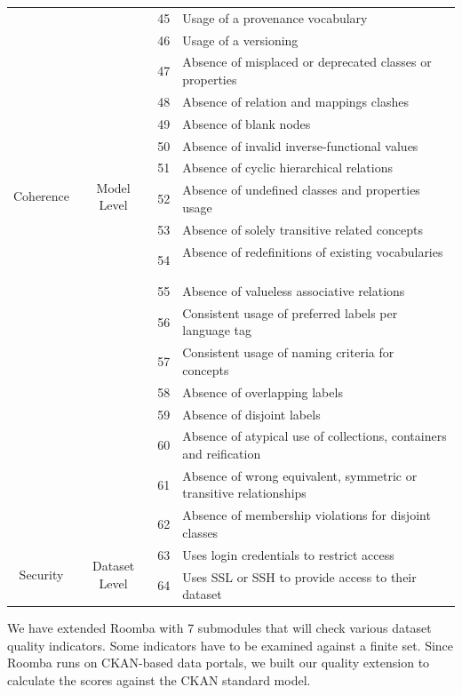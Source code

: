 \documentclass[a4paper,11pt,twoside]{ThesisStyle}
\begin{document}
\begin{center}
{\begin{longtable}[h]{|c|c|c|l|}
\cline{3-4}
 &  & 45 & Usage of a provenance vocabulary\tabularnewline
 \cline{3-4}
 &  & 46 & Usage of a versioning\tabularnewline
\hline
\hline
\multirow{10}{*}{Coherence} & \multirow{10}{*}{Model Level} & 47 & Absence of misplaced or deprecated classes or properties ~\cite{Hogan:LDOW:10}\tabularnewline
\cline{3-4}
 &  & 48 & Absence of relation and mappings clashes ~\cite{Suominen:IKEM:12}\tabularnewline
\cline{3-4}
 &  & 49 & Absence of blank nodes~\cite{Hogan:WebSemJorunal:12}\tabularnewline
\cline{3-4}
 &  & 50 & Absence of invalid inverse-functional values~\cite{Hogan:LDOW:10}\tabularnewline
\cline{3-4}
 &  & 51 & Absence of cyclic hierarchical relations~\cite{Dagobert:DL:02,Suominen:IKEM:12,Mader:TBDL:12}\tabularnewline
\cline{3-4}
 &  & 52 & Absence of undefined classes and properties usage~\cite{Hogan:LDOW:10}\tabularnewline
\cline{3-4}
 &  & 53 & Absence of solely transitive related concepts~\cite{Mader:TBDL:12}\tabularnewline
\cline{3-4}
 &  & 54 & Absence of redefinitions of existing vocabularies ~\cite{Hogan:LDOW:10}\tabularnewline
\cline{3-4}
 &  & 55 & Absence of valueless associative relations ~\cite{Mader:TBDL:12}\tabularnewline
\hline
\hline
\multirow{7}{*}{Consistency}
 & \multirow{7}{*}{Model Level}
& 56 & Consistent usage of preferred labels per language tag~\cite{Isaac:W3C:09,Mader:TBDL:12}\tabularnewline
 \cline{3-4}
 & & 57 & Consistent usage of naming criteria for concepts~\cite{Maria:KEOD:13}\tabularnewline
\cline{3-4}
 &  & 58 & Absence of overlapping labels\tabularnewline
\cline{3-4}
 &  & 59 & Absence of disjoint labels~\cite{Mader:TBDL:12}\tabularnewline
\cline{3-4}
 & & 60 & Absence of atypical use of collections, containers and reification~\cite{Hogan:LDOW:10}\tabularnewline
\cline{3-4}
 &  & 61 & Absence of wrong equivalent, symmetric or transitive relationships~\cite{Maria:KEOD:13}\tabularnewline
\cline{3-4}
 &  & 62 & Absence of membership violations for disjoint classes~\cite{Hogan:LDOW:10}\tabularnewline
\hline
\hline
\multirow{2}{*}{Security} & \multirow{2}{*}{Dataset Level} & 63 & Uses login credentials to restrict access~\cite{Zaveri:SemWebJorunal:12}\tabularnewline
\cline{3-4}
 &  & 64 & Uses SSL or SSH to provide access to their dataset~\cite{Zaveri:SemWebJorunal:12}\tabularnewline
\hline
\end{longtable}
}
\end{center}


We have extended Roomba with 7 submodules that will check various dataset quality indicators. Some indicators have to be examined against a finite set. Since Roomba runs on CKAN-based data portals, we built our quality extension to calculate the scores against the CKAN standard model.
\end{document}
